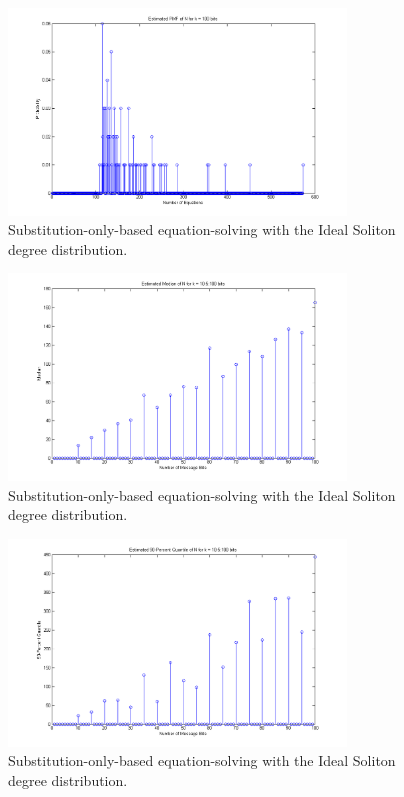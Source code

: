 \documentclass[11pt]{article}
\begin{document}
\begin{enumerate}
    \begin{figure}[H]
        \begin{center}
            \includegraphics[width = 0.8\textwidth]{figure_1c_k100_ideal.png}
            \caption{Substitution-only-based equation-solving with the Ideal Soliton degree distribution.}
        \end{center}
    \end{figure}

    \begin{figure}[H]
        \begin{center}
            \includegraphics[width = 0.8\textwidth]{figure_1c_median_ideal.png}
            \caption{Substitution-only-based equation-solving with the Ideal Soliton degree distribution.}
        \end{center}
    \end{figure}

    \begin{figure}[H]
        \begin{center}
            \includegraphics[width = 0.8\textwidth]{figure_1c_90_percent_quantile_ideal.png}
            \caption{Substitution-only-based equation-solving with the Ideal Soliton degree distribution.}
        \end{center}
    \end{figure}


\end{enumerate}
\end{document}
